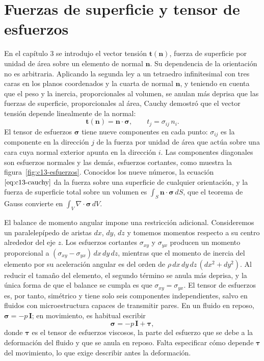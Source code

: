 \documentclass[10pt,openany]{book}
\begin{document}
\section{Fuerzas de superficie y tensor de esfuerzos}

En el capítulo 3 se introdujo el vector tensión \(\mathbf{t}(\mathbf{n})\), fuerza de superficie por unidad de área sobre un elemento de normal \(\mathbf{n}\). Su dependencia de la orientación no es arbitraria. Aplicando la segunda ley a un tetraedro infinitesimal con tres caras en los planos coordenados y la cuarta de normal \(\mathbf{n}\), y teniendo en cuenta que el peso y la inercia, proporcionales al volumen, se anulan más deprisa que las fuerzas de superficie, proporcionales al área, Cauchy demostró que el vector tensión depende linealmente de la normal:
\begin{equation}
\mathbf{t}(\mathbf{n}) = \mathbf{n}\cdot\boldsymbol{\sigma}, \qquad t_j = \sigma_{ij}\,n_i. \label{eq:c13-cauchy}
\end{equation}
El tensor de esfuerzos \(\boldsymbol{\sigma}\) tiene nueve componentes en cada punto: \(\sigma_{ij}\) es la componente en la dirección \(j\) de la fuerza por unidad de área que actúa sobre una cara cuya normal exterior apunta en la dirección \(i\). Las componentes diagonales son esfuerzos normales y las demás, esfuerzos cortantes, como muestra la figura~\ref{fig:c13-esfuerzos}. Conocidos los nueve números, la ecuación \(\eqref{eq:c13-cauchy}\) da la fuerza sobre una superficie de cualquier orientación, y la fuerza de superficie total sobre un volumen es \(\int_S \mathbf{n}\cdot\boldsymbol{\sigma}\,dS\), que el teorema de Gauss convierte en \(\int_V \nabla\cdot\boldsymbol{\sigma}\,dV\).

El balance de momento angular impone una restricción adicional. Consideremos un paralelepípedo de aristas \(dx\), \(dy\), \(dz\) y tomemos momentos respecto a su centro alrededor del eje \(z\). Los esfuerzos cortantes \(\sigma_{xy}\) y \(\sigma_{yx}\) producen un momento proporcional a \((\sigma_{xy} - \sigma_{yx})\,dx\,dy\,dz\), mientras que el momento de inercia del elemento por su aceleración angular es del orden de \(\rho\,dx\,dy\,dz\,(dx^{2} + dy^{2})\). Al reducir el tamaño del elemento, el segundo término se anula más deprisa, y la única forma de que el balance se cumpla es que \(\sigma_{xy} = \sigma_{yx}\). El tensor de esfuerzos es, por tanto, simétrico y tiene solo seis componentes independientes, salvo en fluidos con microestructura capaces de transmitir pares. En un fluido en reposo, \(\boldsymbol{\sigma} = -p\,\mathbf{I}\); en movimiento, es habitual escribir
\begin{equation}
\boldsymbol{\sigma} = -p\,\mathbf{I} + \boldsymbol{\tau}, \label{eq:c13-descomposicion}
\end{equation}
donde \(\boldsymbol{\tau}\) es el tensor de esfuerzos viscosos, la parte del esfuerzo que se debe a la deformación del fluido y que se anula en reposo. Falta especificar cómo depende \(\boldsymbol{\tau}\) del movimiento, lo que exige describir antes la deformación.
\end{document}
